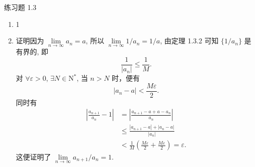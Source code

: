 


% 

\begin{center}
    {\heiti 练习题 1.3}
\end{center}

\begin{enumerate}
    \item 1
    \item
        {\heiti 证明}\quad 因为 $\lim\limits_{n\to\infty}a_n = a$, 所以 $\lim\limits_{n\to\infty}1/a_n = 1/a$,
        由定理 1.3.2 可知 $\{1/a_n\}$ 是有界的, 即
        \[
            \frac{1}{|a_n|}\leqslant\frac1M.
        \]
        对 $\forall \varepsilon > 0$, $\exists N \in \mathrm{N}^*$, 当 $n > N$ 时，便有
        \begin{equation*}
            |a_n - a| < \frac{M\varepsilon}{2}.
        \end{equation*}
        同时有
        \begin{align*}
            \left| \frac{a_{n+1}}{a_n} - 1 \right| &= \left| \frac{a_{n+1} - a + a - a_n}{a_n} \right| \\
                                                   &\leqslant \frac{|a_{n+1} - a| + |a_n - a|}{|a_n|} \\
                                                   &< \frac1M\left( \frac{M\varepsilon}{2} + \frac{M\varepsilon}{2} \right) = \varepsilon.
        \end{align*}
        这便证明了 $\lim\limits_{n\to\infty}a_{n+1}/a_n = 1$.
    

\end{enumerate}
